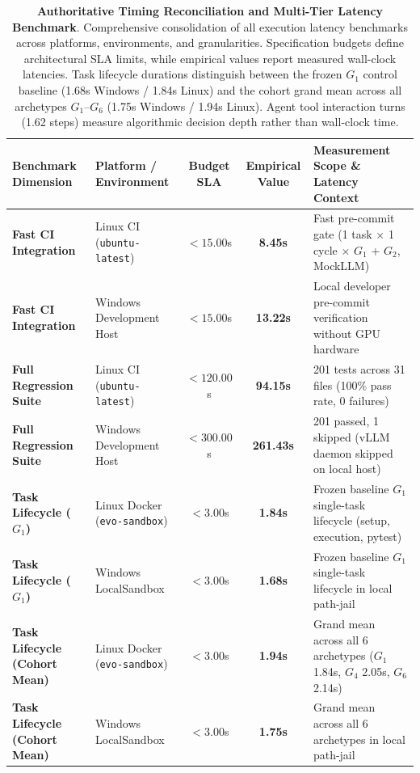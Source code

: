 \begin{table}[t]
\centering
\small
\caption{\textbf{Authoritative Timing Reconciliation and Multi-Tier Latency Benchmark}. Comprehensive consolidation of all execution latency benchmarks across platforms, environments, and granularities. Specification budgets define architectural SLA limits, while empirical values report measured wall-clock latencies. Task lifecycle durations distinguish between the frozen $G_1$ control baseline (1.68s Windows / 1.84s Linux) and the cohort grand mean across all archetypes $G_1$--$G_6$ (1.75s Windows / 1.94s Linux). Agent tool interaction turns (1.62 steps) measure algorithmic decision depth rather than wall-clock time.}
\label{tab:timing_reconciliation}
\begin{tabular}{llccp{7.2cm}}
\toprule
\textbf{Benchmark Dimension} & \textbf{Platform / Environment} & \textbf{Budget SLA} & \textbf{Empirical Value} & \textbf{Measurement Scope \& Latency Context} \\
\midrule
\textbf{Fast CI Integration} & Linux CI (\texttt{ubuntu-latest}) & $< 15.00$s & \textbf{8.45s} & Fast pre-commit gate (1 task $\times$ 1 cycle $\times$ $G_1$ + $G_2$, MockLLM) \\
\textbf{Fast CI Integration} & Windows Development Host & $< 15.00$s & \textbf{13.22s} & Local developer pre-commit verification without GPU hardware \\
\midrule
\textbf{Full Regression Suite} & Linux CI (\texttt{ubuntu-latest}) & $< 120.00$s & \textbf{94.15s} & 201 tests across 31 files (100\% pass rate, 0 failures) \\
\textbf{Full Regression Suite} & Windows Development Host & $< 300.00$s & \textbf{261.43s} & 201 passed, 1 skipped (vLLM daemon skipped on local host) \\
\midrule
\textbf{Task Lifecycle ($G_1$)} & Linux Docker (\texttt{evo-sandbox}) & $< 3.00$s & \textbf{1.84s} & Frozen baseline $G_1$ single-task lifecycle (setup, execution, pytest) \\
\textbf{Task Lifecycle ($G_1$)} & Windows LocalSandbox & $< 3.00$s & \textbf{1.68s} & Frozen baseline $G_1$ single-task lifecycle in local path-jail \\
\textbf{Task Lifecycle (Cohort Mean)} & Linux Docker (\texttt{evo-sandbox}) & $< 3.00$s & \textbf{1.94s} & Grand mean across all 6 archetypes ($G_1$ 1.84s, $G_4$ 2.05s, $G_6$ 2.14s) \\
\textbf{Task Lifecycle (Cohort Mean)} & Windows LocalSandbox & $< 3.00$s & \textbf{1.75s} & Grand mean across all 6 archetypes in local path-jail \\

\end{tabular}
\end{table}
